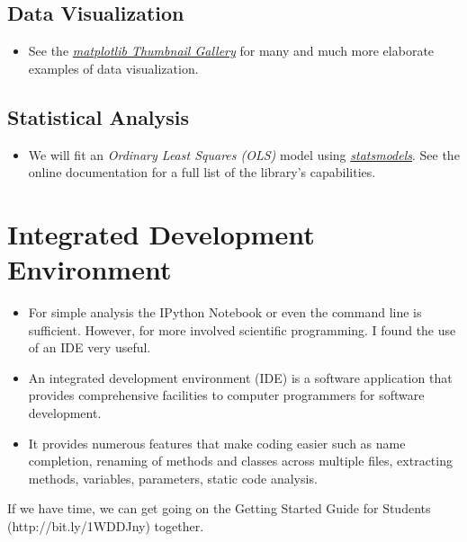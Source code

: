 \subsection{Data Visualization }
\begin{itemize}
\item See the \href{http://matplotlib.org/gallery.html}{\textit{matplotlib Thumbnail Gallery}} for many and much more elaborate examples of data visualization.
\end{itemize}
\subsection{Statistical Analysis}
\begin{itemize}
\item We will fit an \textit{Ordinary Least Squares (OLS)} model using \href{http://statsmodels.sourceforge.net}{\textit{statsmodels}}. See the online documentation for a full list of the library's capabilities.
\end{itemize}
\section{Integrated Development Environment}
\begin{itemize}
\item For simple analysis the IPython Notebook or even the command line is sufficient. However, for more involved scientific programming. I found the use of an IDE very useful.
\item An integrated development environment (IDE) is a software application that provides comprehensive facilities to computer programmers for software development.
\item It provides numerous features that make coding easier such as name completion, renaming of methods and classes across multiple files, extracting methods, variables, parameters, static code analysis.
\end{itemize}

If we have time, we can get going on the Getting Started Guide for Students (http://bit.ly/1WDDJny) together. 
